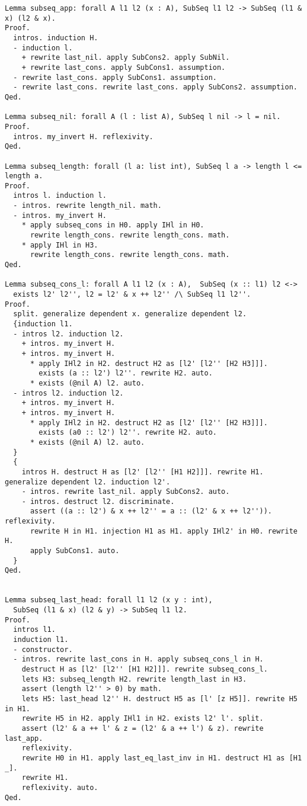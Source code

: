\begin{verbatim}
Lemma subseq_app: forall A l1 l2 (x : A), SubSeq l1 l2 -> SubSeq (l1 & x) (l2 & x). 
Proof.
  intros. induction H. 
  - induction l. 
    + rewrite last_nil. apply SubCons2. apply SubNil. 
    + rewrite last_cons. apply SubCons1. assumption. 
  - rewrite last_cons. apply SubCons1. assumption. 
  - rewrite last_cons. rewrite last_cons. apply SubCons2. assumption. 
Qed.

Lemma subseq_nil: forall A (l : list A), SubSeq l nil -> l = nil. 
Proof.
  intros. my_invert H. reflexivity. 
Qed.

Lemma subseq_length: forall (l a: list int), SubSeq l a -> length l <= length a. 
Proof.
  intros l. induction l. 
  - intros. rewrite length_nil. math. 
  - intros. my_invert H. 
    * apply subseq_cons in H0. apply IHl in H0. 
      rewrite length_cons. rewrite length_cons. math. 
    * apply IHl in H3. 
      rewrite length_cons. rewrite length_cons. math. 
Qed.

Lemma subseq_cons_l: forall A l1 l2 (x : A),  SubSeq (x :: l1) l2 <-> 
  exists l2' l2'', l2 = l2' & x ++ l2'' /\ SubSeq l1 l2''. 
Proof.
  split. generalize dependent x. generalize dependent l2. 
  {induction l1.  
  - intros l2. induction l2. 
    + intros. my_invert H. 
    + intros. my_invert H. 
      * apply IHl2 in H2. destruct H2 as [l2' [l2'' [H2 H3]]]. 
        exists (a :: l2') l2''. rewrite H2. auto. 
      * exists (@nil A) l2. auto. 
  - intros l2. induction l2. 
    + intros. my_invert H. 
    + intros. my_invert H. 
      * apply IHl2 in H2. destruct H2 as [l2' [l2'' [H2 H3]]]. 
        exists (a0 :: l2') l2''. rewrite H2. auto. 
      * exists (@nil A) l2. auto. 
  }
  {
    intros H. destruct H as [l2' [l2'' [H1 H2]]]. rewrite H1. generalize dependent l2. induction l2'. 
    - intros. rewrite last_nil. apply SubCons2. auto. 
    - intros. destruct l2. discriminate. 
      assert ((a :: l2') & x ++ l2'' = a :: (l2' & x ++ l2'')). reflexivity. 
      rewrite H in H1. injection H1 as H1. apply IHl2' in H0. rewrite H. 
      apply SubCons1. auto. 
  } 
Qed.


Lemma subseq_last_head: forall l1 l2 (x y : int), 
  SubSeq (l1 & x) (l2 & y) -> SubSeq l1 l2. 
Proof.
  intros l1. 
  induction l1. 
  - constructor. 
  - intros. rewrite last_cons in H. apply subseq_cons_l in H. 
    destruct H as [l2' [l2'' [H1 H2]]]. rewrite subseq_cons_l. 
    lets H3: subseq_length H2. rewrite length_last in H3. 
    assert (length l2'' > 0) by math. 
    lets H5: last_head l2'' H. destruct H5 as [l' [z H5]]. rewrite H5 in H1. 
    rewrite H5 in H2. apply IHl1 in H2. exists l2' l'. split. 
    assert (l2' & a ++ l' & z = (l2' & a ++ l') & z). rewrite last_app. 
    reflexivity. 
    rewrite H0 in H1. apply last_eq_last_inv in H1. destruct H1 as [H1 _]. 
    rewrite H1. 
    reflexivity. auto. 
Qed.


\end{verbatim}
